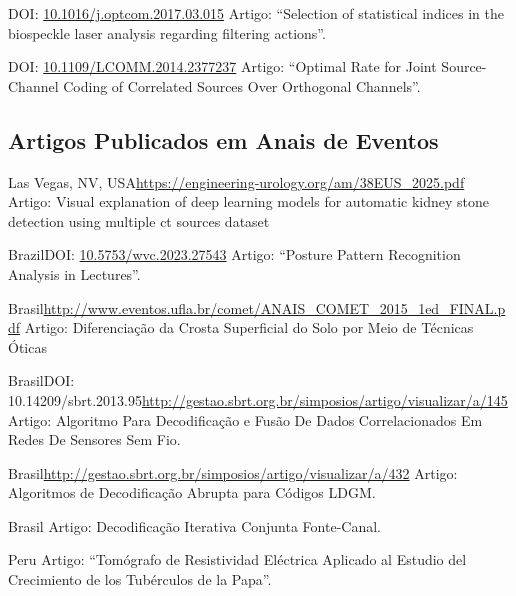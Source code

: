 \documentclass[11pt,a4paper,sans]{moderncv} %
\newcommand{\doiurl}[1]{\href{https://doi.org/#1}{#1}}
\begin{document}
	      {DOI: \doiurl{10.1016/j.optcom.2017.03.015}}{}{}
	      {Artigo: ``Selection of statistical indices in the biospeckle laser analysis regarding filtering actions''.}
	      
	      {DOI: \doiurl{10.1109/LCOMM.2014.2377237}}{}{}
	      {Artigo: ``Optimal  Rate for Joint Source-Channel Coding of Correlated Sources Over Orthogonal Channels''.}

\subsection{Artigos Publicados em Anais de Eventos}

	      {Las Vegas, NV, USA}{}{\url{https://engineering-urology.org/am/38EUS_2025.pdf}}
	      {Artigo: Visual explanation of deep learning models for automatic
kidney stone detection using multiple ct sources dataset}

	      {Brazil}{}{DOI: \doiurl{10.5753/wvc.2023.27543} }
	      {Artigo: ``Posture Pattern Recognition Analysis in Lectures''.}

	      {Brasil}{}{\url{http://www.eventos.ufla.br/comet/ANAIS\_COMET\_2015\_1ed\_FINAL.pdf}}
	      {Artigo: Diferenciação da Crosta Superficial do Solo por Meio de Técnicas Óticas}

	      {Brasil}{DOI: 10.14209/sbrt.2013.95}{\url{http://gestao.sbrt.org.br/simposios/artigo/visualizar/a/145}}
	      {Artigo: Algoritmo Para Decodificação e Fusão De Dados Correlacionados Em Redes De Sensores Sem Fio.}

	      {Brasil}{}{\url{http://gestao.sbrt.org.br/simposios/artigo/visualizar/a/432}}
	      {Artigo: Algoritmos de Decodificação Abrupta para Códigos LDGM.}

	      {Brasil}{}{}%
	      {Artigo: Decodificação Iterativa Conjunta Fonte-Canal.}

	      {Peru}{}{}
	      {Artigo: ``Tomógrafo de Resistividad Eléctrica Aplicado al Estudio del Crecimiento de los Tubérculos de la Papa''.}
\end{document}
